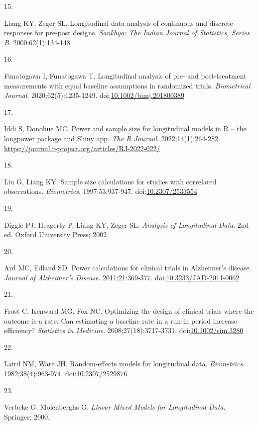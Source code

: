 \documentclass[
  11pt,
]{article}
\newlength{\cslhangindent}
\newlength{\csllabelwidth}
\newenvironment{CSLReferences}[2] %
 {\begin{list}{}{%
  \setlength{\itemindent}{0pt}
  \setlength{\leftmargin}{0pt}
  \setlength{\parsep}{0pt}
  \ifodd #1
   \setlength{\leftmargin}{\cslhangindent}
   \setlength{\itemindent}{-1\cslhangindent}
  \fi
  \setlength{\itemsep}{#2\baselineskip}}}
 {\end{list}}
\newcommand{\CSLLeftMargin}[1]{\parbox[t]{\csllabelwidth}{\strut#1\strut}}
\newcommand{\CSLRightInline}[1]{\parbox[t]{\linewidth - \csllabelwidth}{\strut#1\strut}}
\begin{document}
\begin{CSLReferences}{0}{1}
\CSLLeftMargin{15. }%
\CSLRightInline{Liang KY, Zeger SL. Longitudinal data analysis of continuous and discrete responses for pre-post designs. \emph{Sankhya: The Indian Journal of Statistics, Series B}. 2000;62(1):134-148.}

\CSLLeftMargin{16. }%
\CSLRightInline{Funatogawa I, Funatogawa T. Longitudinal analysis of pre- and post-treatment measurements with equal baseline assumptions in randomized trials. \emph{Biometrical Journal}. 2020;62(5):1235-1249. doi:\href{https://doi.org/10.1002/bimj.201800389}{10.1002/bimj.201800389}}

\CSLLeftMargin{17. }%
\CSLRightInline{Iddi S, Donohue MC. Power and sample size for longitudinal models in {R} -- the longpower package and {Shiny} app. \emph{The R Journal}. 2022;14(1):264-282. \url{https://journal.r-project.org/articles/RJ-2022-022/}}

\CSLLeftMargin{18. }%
\CSLRightInline{Liu G, Liang KY. Sample size calculations for studies with correlated observations. \emph{Biometrics}. 1997;53:937-947. doi:\href{https://doi.org/10.2307/2533554}{10.2307/2533554}}

\CSLLeftMargin{19. }%
\CSLRightInline{Diggle PJ, Heagerty P, Liang KY, Zeger SL. \emph{Analysis of Longitudinal Data}. 2nd ed. Oxford University Press; 2002.}

\CSLLeftMargin{20. }%
\CSLRightInline{Ard MC, Edland SD. Power calculations for clinical trials in {Alzheimer's} disease. \emph{Journal of Alzheimer's Disease}. 2011;21:369-377. doi:\href{https://doi.org/10.3233/JAD-2011-0062}{10.3233/JAD-2011-0062}}

\CSLLeftMargin{21. }%
\CSLRightInline{Frost C, Kenward MG, Fox NC. Optimizing the design of clinical trials where the outcome is a rate. {Can} estimating a baseline rate in a run-in period increase efficiency? \emph{Statistics in Medicine}. 2008;27(18):3717-3731. doi:\href{https://doi.org/10.1002/sim.3280}{10.1002/sim.3280}}

\CSLLeftMargin{22. }%
\CSLRightInline{Laird NM, Ware JH. Random-effects models for longitudinal data. \emph{Biometrics}. 1982;38(4):963-974. doi:\href{https://doi.org/10.2307/2529876}{10.2307/2529876}}

\CSLLeftMargin{23. }%
\CSLRightInline{Verbeke G, Molenberghs G. \emph{Linear Mixed Models for Longitudinal Data}. Springer; 2000.}


\end{CSLReferences}
\end{document}
